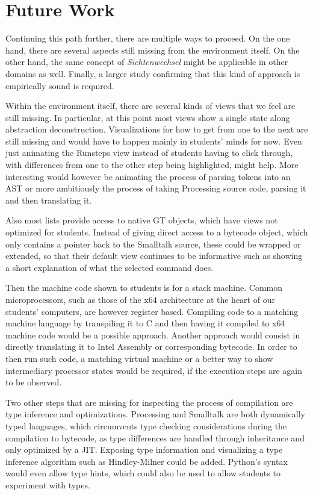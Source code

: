 \section{Future Work} \label{sc_future}

Continuing this path further, there are multiple ways to proceed. On the one hand, there are several aspects still missing from the environment itself. On the other hand, the same concept of \emph{Sichtenwechsel} might be applicable in other domains as well. Finally, a larger study confirming that this kind of approach is empirically sound is required.

Within the environment itself, there are several kinds of views that we feel are still missing. In particular, at this point most views show a single state along abstraction deconstruction. Visualizations for how to get from one to the next are still missing and would have to happen mainly in students' minds for now. Even just animating the Runsteps view instead of students having to click through, with differences from one to the other step being highlighted, might help. More interesting would however be animating the process of parsing tokens into an \ac{AST} or more ambitiously the process of taking Processing source code, parsing it and then translating it.

Also most lists provide access to native \ac{GT} objects, which have views not optimized for students. Instead of \eg giving direct access to a bytecode object, which only contains a pointer back to the Smalltalk source, these could be wrapped or extended, so that their default view continues to be informative such as showing a short explanation of what the selected command does.

Then the machine code shown to students is for a stack machine. Common microprocessors, such as those of the x64 architecture at the heart of our students' computers, are however register based. Compiling code to a matching machine language by \eg transpiling it to C and then having it compiled to x64 machine code would be a possible approach. Another approach would consist in directly translating it to Intel Assembly or corresponding bytecode. In order to then run such code, a matching virtual machine or a better way to show intermediary processor states would be required, if the execution steps are again to be observed.

Two other steps that are missing for inspecting the process of compilation are type inference and optimizations. Processing and Smalltalk are both dynamically typed languages, which circumvents type checking considerations during the compilation to bytecode, as type differences are handled through inheritance and only optimized by a \ac{JIT}. Exposing type information and visualizing a type inference algorithm such as Hindley-Milner could be added. Python's syntax would even allow type hints, which could also be used to allow students to experiment with types.

